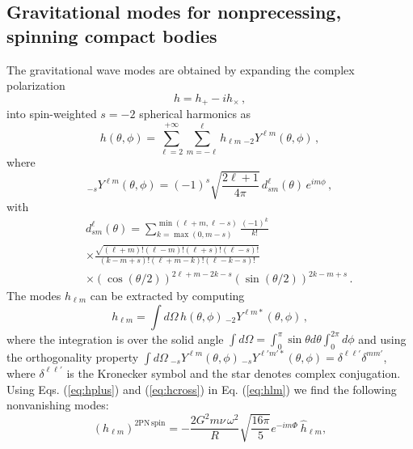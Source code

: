\documentclass[aps, prd,
twocolumn,%
superscriptaddress,
showpacs, nofootinbib, eqsecnum, amsmath, amssymb, floatfix
]{revtex4}
\begin{document}
\subsection{Gravitational modes for nonprecessing, spinning compact bodies}
\label{sec:modes}
The gravitational wave modes are obtained by expanding the complex polarization
\begin{equation}
h =  h_+
- i h_\times\,,
\label{hcomplex}
\end{equation}
into  spin-weighted $s=-2$ spherical harmonics as
%
\begin{equation}\label{eq:modeexp}
h(\theta,\phi) = \sum_{\ell = 2}^{+\infty} \sum_{m=-\ell}^{\ell} h_{\ell m}\,
{}_{-2}Y^{\ell m}(\theta,\phi) \, ,
\end{equation}
%
where
%
\begin{equation}
{}_{-s} Y^{\ell m}(\theta,\phi) = (-1)^s \sqrt{\frac{2\ell + 1}{4\pi}}
\, d_{sm}^\ell(\theta)\, e^{i m \phi}\,,
\end{equation}
%
with
%
\begin{eqnarray}
&&d_{sm}^\ell(\theta) = \sum_{k=\max(0,m-s)}^{\min(\ell+m,\ell-s)}
\frac{(-1)^k}{k!} \nonumber\\
&&\times
\frac{\sqrt{(\ell + m)! (\ell - m)!(\ell + s)!(\ell - s)!}}{(k - m + s)!
    (\ell + m - k)!  (\ell - k - s)!} \ \ \ \ \ \ \ \ \ \nonumber\\
&&\times \left(\cos (\theta/2)\right)^{2\ell+m-2k-s}
\left( \sin (\theta/2) \right)^{2k-m+s} \,.
\end{eqnarray}
%
The modes $h_{\ell m}$ can be extracted by computing
\begin{equation}
\label{eq:hlm}
h_{\ell m} = \int d\Omega  \, h(\theta, \phi)
\, {}_{-2}{Y}^{\ell  m*}(\theta,\phi) \,,
\end{equation}
%
where the integration is over the solid angle $\int d\Omega=\int^{\pi}_0
\sin\theta d\theta \int^{2\pi}_0d\phi $
and using the orthogonality property
%
$ \int d\Omega   \ {}_{-s}Y^{\ell m}(\theta,\phi)
\, {}_{-s}Y^{\ell' m' *}(\theta,\phi) = \delta^{\ell \ell'} \delta^{m m'}$,
%
where $ \delta^{\ell \ell'}$ is the Kronecker symbol and the star denotes
complex conjugation.
%
Using Eqs. (\ref{eq:hplus}) and (\ref{eq:hcross}) in Eq.
(\ref{eq:hlm}) we find the following nonvanishing modes:
%
\begin{equation}
( h_{\ell m})^\mathrm{2PN\,spin }=-\frac{2 G^2 m \nu \,
  \omega^2}{R}\sqrt{\frac{16\pi}{5}}e^{-im\Phi}
\ \hat h_{\ell m},
\end{equation}
%
\end{document}
